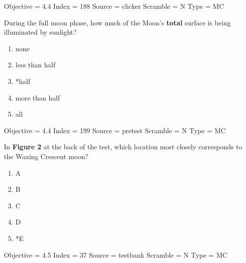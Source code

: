 \documentclass[11pt]{article}
\begin{document}
\begin{enumerate}
\begin{minipage}{\textwidth}
\begin{minipage}{\textwidth}
Objective = 4.4
Index = 188
Source = clicker
Scramble = N
Type = MC
\end{minipage}
\end{minipage}
\vskip 0.20in

\begin{minipage}{\textwidth}
\begin{minipage}{\textwidth}
\item During the full moon phase, how much of the Moon’s {\bf total} surface is being illuminated by sunlight?
\begin{multicols}{3}
\begin{enumerate} 
\setlength{\itemsep}{1pt} 
\setlength{\parskip}{0pt} 
\setlength{\parsep}{0pt}
\setlength{\multicolsep}{1pt} 
\item none
\item less than half
\item *half
\item more than half
\item all
\end{enumerate} 
\vfill 
\end{multicols}

Objective = 4.4
Index = 199
Source = pretest
Scramble = N
Type = MC
\end{minipage}
\end{minipage}
\vskip 0.20in

\begin{minipage}{\textwidth}
\begin{minipage}{\textwidth}
\item In {\bf Figure 2} at the back of the test, which location most closely corresponds to the Waxing Crescent moon?
\begin{multicols}{3}
\begin{enumerate} 
\setlength{\itemsep}{1pt} 
\setlength{\parskip}{0pt} 
\setlength{\parsep}{0pt}
\setlength{\multicolsep}{1pt} 
\item A
\item B
\item C
\item D
\item *E
\end{enumerate} 
\vfill 
\end{multicols}

Objective = 4.5
Index = 37
Source = testbank
Scramble = N
Type = MC
\end{minipage}
\end{minipage}
\vskip 0.20in


\end{enumerate}
\end{document}
